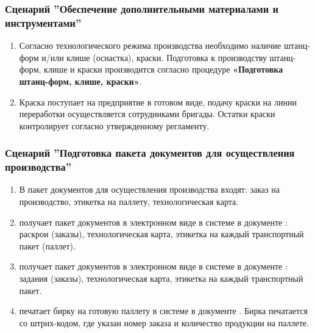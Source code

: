 \subsubsection{Сценарий ''Обеспечение дополнительными материалами и инструментами''}
\label{bp:production_5}

\begin{enumerate}
\item	Согласно технологического режима производства необходимо наличие штанц-форм и/или клише (оснастка), краски. Подготовка к производству штанц-форм, клише и краски производится согласно процедуре \textbf{«Подготовка штанц-форм, клише, краски»}.

\item Краска поступает на предприятие в готовом виде, подачу краски на линии переработки осуществляется сотрудниками бригады. Остатки краски \master контролирует согласно утвержденному регламенту.

\end{enumerate}



\subsubsection{Сценарий ''Подготовка пакета документов для осуществления производства''}
\label{bp:production_6}

\begin{enumerate}
\item	В пакет документов для осуществления производства входят: заказ на производство, этикетка на паллету, технологическая карта.
\item \gaoperator получает пакет документов в электронном виде в системе \gofro в документе : раскрои (заказы), технологическая карта, этикетка на каждый транспортный пакет (паллет).
\item \operator получает пакет документов в электронном виде в системе \gofro в документе : задания (заказы), технологическая карта, этикетка на каждый транспортный пакет.
\item \operator печатает бирку на готовую паллету в системе \gofro в документе . Бирка печатается со штрих-кодом, где указан номер заказа и количество продукции на паллете.

\end{enumerate}


